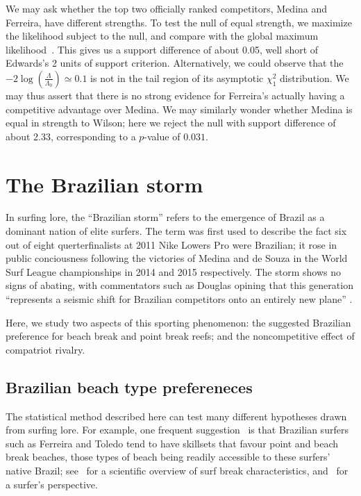 \documentclass{article}
\begin{document}
We may ask whether the top two officially ranked competitors, Medina
and Ferreira, have different strengths.  To test the null of equal
strength, we maximize the likelihood subject to the null, and compare
with the global maximum likelihood~\cite{hankin2010}.  This gives us a
support difference of about 0.05, well short of Edwards's 2 units of
support criterion.  Alternatively, we could observe that the
$-2\log\left(\frac{\Lambda}{\Lambda_0}\right)\simeq 0.1$ is not in the
tail region of its asymptotic $\chi^2_1$ distribution.  We may thus
assert that there is no strong evidence for Ferreira's actually having
a competitive advantage over Medina.  We may similarly wonder whether
Medina is equal in strength to Wilson; here we reject the null with
support difference of about 2.33, corresponding to a $p$-value of
$0.031$.

\section{The Brazilian storm}

In surfing lore, the ``Brazilian storm'' refers to the emergence of
Brazil as a dominant nation of elite surfers.  The term was first used
to describe the fact six out of eight querterfinalists at 2011 Nike
Lowers Pro were Brazilian; it rose in public conciousness following
the victories of Medina and de Souza in the World Surf League
championships in 2014 and 2015 respectively.  The storm shows no signs
of abating, with commentators such as Douglas opining that this
generation ``represents a seismic shift for Brazilian competitors onto
an entirely new plane'' \cite{douglas2020}.

Here, we study two aspects of this sporting phenomenon: the suggested
Brazilian preference for beach break and point break reefs; and the
noncompetitive effect of compatriot rivalry.

\subsection{Brazilian beach type prefereneces}

The statistical method described here can test many different
hypotheses drawn from surfing lore.  For example, one frequent
suggestion~\cite{burgess2020,ho2021} is that Brazilian surfers such as
Ferreira and Toledo tend to have skillsets that favour point and beach
break beaches, those types of beach being readily accessible to these
surfers' native Brazil; see~\cite{scarfe2003} for a scientific
overview of surf break characteristics, and~\cite{butt2004} for a
surfer's perspective.
\end{document}
